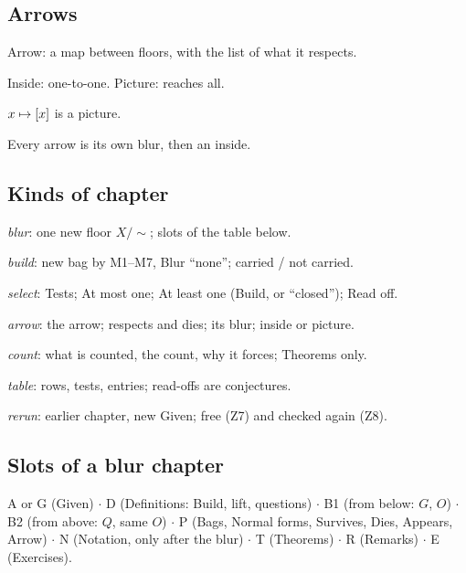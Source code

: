 \subsection*{Arrows}
\begin{lines}
\item[\lab{W1}] Arrow: a map between floors, with the list of what it respects.
\item[\lab{W2}] Inside: one-to-one. Picture: reaches all.
\item[\lab{W3}] $x \mapsto [x]$ is a picture.
\item[\lab{W4}] Every arrow is its own blur, then an inside.
\end{lines}

\subsection*{Kinds of chapter}
\begin{lines}
\item[\lab{K1}] \emph{blur}: one new floor $X/{\sim}$; slots of the table below.
\item[\lab{K2}] \emph{build}: new bag by M1--M7, Blur ``none''; carried / not carried.
\item[\lab{K3}] \emph{select}: Tests; At most one; At least one (Build, or ``closed''); Read off.
\item[\lab{K4}] \emph{arrow}: the arrow; respects and dies; its blur; inside or picture.
\item[\lab{K5}] \emph{count}: what is counted, the count, why it forces; Theorems only.
\item[\lab{K6}] \emph{table}: rows, tests, entries; read-offs are conjectures.
\item[\lab{K7}] \emph{rerun}: earlier chapter, new Given; free (Z7) and checked again (Z8).
\end{lines}

\subsection*{Slots of a blur chapter}
A or G (Given) $\cdot$ D (Definitions: Build, lift, questions) $\cdot$ B1 (from below: $G$, $O$) $\cdot$ B2 (from above: $Q$, same $O$) $\cdot$ P (Bags, Normal forms, Survives, Dies, Appears, Arrow) $\cdot$ N (Notation, only after the blur) $\cdot$ T (Theorems) $\cdot$ R (Remarks) $\cdot$ E (Exercises).

